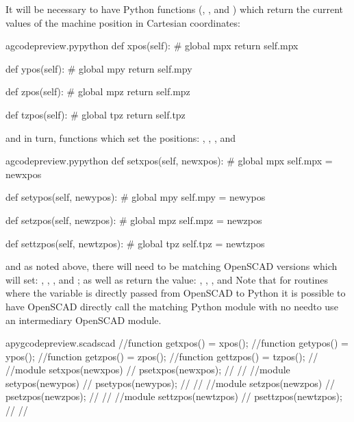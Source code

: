 \documentclass{ltxdoc}
\begin{document}
It will be necessary to have Python functions (, , and ) which return the current values of the machine position in Cartesian coordinates: 

\lstset{firstnumber=\thegcpy}
\begin{writecode}{a}{gcodepreview.py}{python}
    def xpos(self):
#        global mpx
        return self.mpx

    def ypos(self):
#        global mpy
        return self.mpy

    def zpos(self):
#        global mpz
        return self.mpz

    def tzpos(self):
#        global tpz
        return self.tpz

\end{writecode}
\addtocounter{gcpy}{16}

\noindent and in turn, functions which set the positions: 
,
,
, and

\lstset{firstnumber=\thegcpy}
\begin{writecode}{a}{gcodepreview.py}{python}
    def setxpos(self, newxpos):
#        global mpx
        self.mpx = newxpos

    def setypos(self, newypos):
#        global mpy
        self.mpy = newypos

    def setzpos(self, newzpos):
#        global mpz
        self.mpz = newzpos
     
    def settzpos(self, newtzpos):
#        global tpz
        self.tpz = newtzpos

\end{writecode}
\addtocounter{gcpy}{16}
 
\noindent and as noted above, there will need to be matching OpenSCAD versions which will set: , , , and ; as well as return the value: , , , and  Note that for routines where the variable is directly passed from OpenSCAD to Python it is possible to have OpenSCAD directly call the matching Python module with no needto use an intermediary OpenSCAD module.
 
\lstset{firstnumber=\thepyscad}
\begin{writecode}{a}{pygcodepreview.scad}{scad}
//function getxpos() = xpos();
//function getypos() = ypos();
//function getzpos() = zpos();
//function gettzpos() = tzpos();
//
//module setxpos(newxpos) {
//    psetxpos(newxpos);
//}
//
//module setypos(newypos) {
//    psetypos(newypos);
//}
//
//module setzpos(newzpos) {
//    psetzpos(newzpos);
//}
//
//module settzpos(newtzpos) {
//    psettzpos(newtzpos);
//}
//
\end{writecode}
\addtocounter{pyscad}{21}
 
\end{document}
